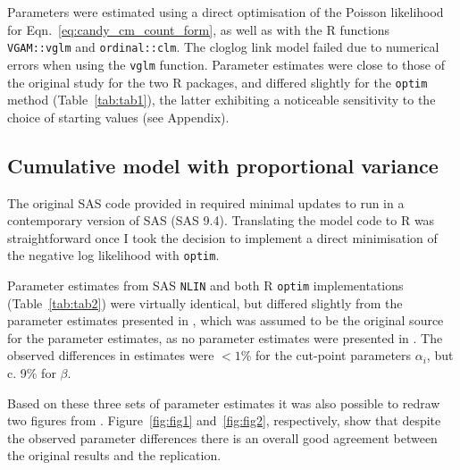 Parameters were estimated using a direct optimisation of the Poisson likelihood for Eqn.~\ref{eq:candy_cm_count_form}, as well as with the R functions \verb+VGAM::vglm+ and \verb+ordinal::clm+. 
The cloglog link model failed due to numerical errors when using the \verb+vglm+ function. 
Parameter estimates were close to those of the original study for the two R packages, and differed slightly for the \verb+optim+ method (Table~\ref{tab:tab1}), the latter exhibiting a noticeable sensitivity to the choice of starting values (see Appendix).

\subsection{Cumulative model with proportional variance}



The original SAS code provided in \citep{dennis1986stochastic} required minimal updates to run in a contemporary version of SAS (SAS 9.4). 
Translating the model code to R was straightforward once I took the decision to implement a direct minimisation of the negative log likelihood with \verb+optim+.  

Parameter estimates from SAS \verb+NLIN+ and both R \verb+optim+ implementations (Table~\ref{tab:tab2}) were virtually identical, but differed slightly from the parameter estimates presented in \citep{kemp1986stochastic}, which was assumed to be the original source for the parameter estimates, as no parameter estimates were presented in \citep{dennis1986stochastic}. 
The observed differences in estimates were $<1$\% for the cut-point parameters $\alpha_i$, but c. 9\% for $\beta$.

Based on these three sets of parameter estimates it was also possible to redraw two figures from \citep{dennis1986stochastic}. 
Figure~\ref{fig:fig1} and~\ref{fig:fig2}, respectively, show that despite the observed parameter differences  there is an overall good agreement between the original results and the replication.

